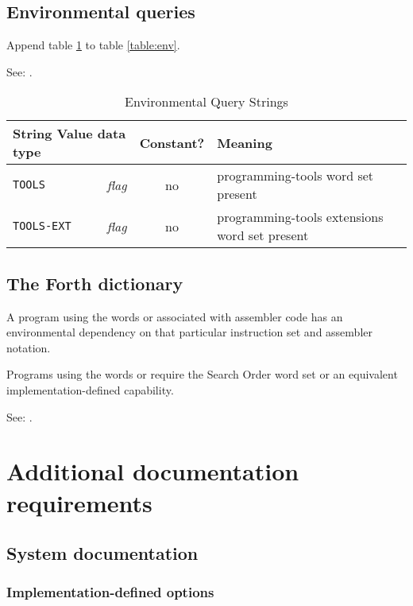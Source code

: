 \subsection{Environmental queries} %

Append table \ref{tools:env} to table \ref{table:env}.

See: .

\begin{table}[ht]
  \begin{center}
	\caption{Environmental Query Strings}
	\label{tools:env}
	\begin{tabular}{p{9em}rcp{}}
		\hline\hline
		\multicolumn{2}{l}{String \hfill Value data type} & Constant? & Meaning \\
		\hline
		\texttt{TOOLS}		& \emph{flag}		& no	&
			programming-tools word set present \\
		\texttt{TOOLS-EXT}	& \emph{flag}		& no	&
			programming-tools extensions word set present \\
		\hline\hline
	\end{tabular}
  \end{center}
\end{table}

\subsection{The Forth dictionary} %
\label{tools:dict}

A program using the words  or  associated
with assembler code has an environmental dependency on that
particular instruction set and assembler notation.

Programs using the words  or  require
the Search Order word set or an equivalent implementation-defined
capability.

See: .

\section{Additional documentation requirements} %

\subsection{System documentation} %

\subsubsection{Implementation-defined options} %

